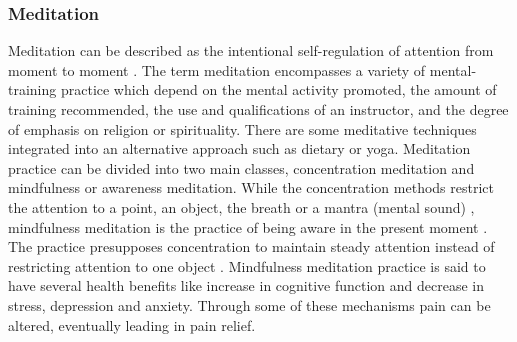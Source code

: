 \subsubsection{Meditation}

Meditation can be described as the intentional self-regulation of attention from moment to moment \cite{Kabat1982}.
The term meditation encompasses a variety of mental-training practice which depend on the mental activity promoted, the amount of training recommended, the use and qualifications of an instructor, and the degree of emphasis on religion or spirituality. There are some meditative techniques integrated into an alternative approach such as dietary or yoga. \cite{Goyal2014} Meditation practice can be divided into two main classes, concentration meditation and mindfulness or awareness meditation. While the concentration methods restrict the attention to a point, an object, the breath or a mantra (mental sound) \cite{Kabat1982}, mindfulness meditation is the practice of being aware in the present moment \cite{Zeidan2016}. The practice presupposes concentration to maintain steady attention instead of restricting attention to one object \cite{Kabat1982}. Mindfulness meditation practice is said to have several health benefits like increase in cognitive function and decrease in stress, depression and anxiety. Through some of these mechanisms pain can be altered, eventually leading in pain relief. \cite{Zeidan2016} 

